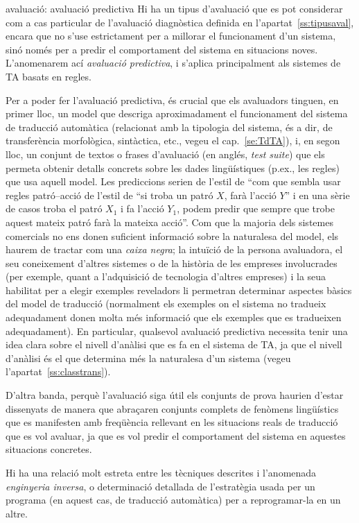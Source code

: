 \begin{persabermes}{avaluació: avaluació predictiva}
  Hi ha un tipus d'avaluació que es pot considerar com a cas
  particular de l'avaluació diagnòstica definida en
  l'apartat~\ref{ss:tipusaval}, encara que no s'use estrictament per a
  millorar el funcionament d'un sistema, sinó només per a predir el
  comportament del sistema en situacions noves.  L'anomenarem ací
  \emph{avaluació predictiva}, i s'aplica principalment als sistemes
  de TA basats en regles.

  Per a poder fer l'avaluació predictiva, és crucial que els
  avaluadors tinguen, en primer lloc, un model que descriga
  aproximadament el funcionament del sistema de traducció automàtica
  (relacionat amb la tipologia del sistema, és a dir, de transferència
  morfològica, sintàctica, etc., vegeu el cap.~\ref{se:TdTA}), i, en
  segon lloc, un conjunt de textos o frases d'avaluació (en anglés,
  \emph{test suite}) que els permeta obtenir detalls concrets sobre
  les dades lingüístiques (p.ex., les regles) que usa aquell model.
  Les prediccions serien de l'estil de ``com que sembla usar regles
  patró--acció de l'estil de ``si troba un patró $X$, farà l'acció
  $Y$'' i en una sèrie de casos troba el patró $X_1$ i fa l'acció
  $Y_1$, podem predir que sempre que trobe aquest mateix patró farà la
  mateixa acció''. Com que la majoria dels sistemes comercials no ens
  donen suficient informació sobre la naturalesa del model, els haurem
  de tractar com una \emph{caixa negra}; la intuïció de la persona
  avaluadora, el seu coneixement d'altres sistemes o de la història de
  les empreses involucrades (per exemple, quant a l'adquisició de
  tecnologia d'altres empreses) i la seua habilitat per a elegir
  exemples reveladors li permetran determinar aspectes bàsics del
  model de traducció (normalment els exemples on el sistema no
  tradueix adequadament donen molta més informació que els exemples
  que es tradueixen adequadament). En particular, qualsevol avaluació
  predictiva necessita tenir una idea clara sobre el nivell d'anàlisi
  que es fa en el sistema de TA, ja que el nivell d'anàlisi és el que
  determina més la naturalesa d'un sistema (vegeu
  l'apartat~\ref{ss:classtrans}).

  D'altra banda, perquè l'avaluació siga útil els conjunts de prova
  haurien d'estar dissenyats de manera que abraçaren conjunts complets
  de fenòmens lingüístics que es manifesten amb freqüència rellevant
  en les situacions reals de traducció que es vol avaluar, ja que es
  vol predir el comportament del sistema en aquestes situacions
  concretes.

  Hi ha una relació molt estreta entre les tècniques descrites i
  l'anomenada \emph{enginyeria inversa}, o determinació detallada de
  l'estratègia usada per un programa (en aquest cas, de traducció
  automàtica) per a reprogramar-la en un altre.
\end{persabermes}

